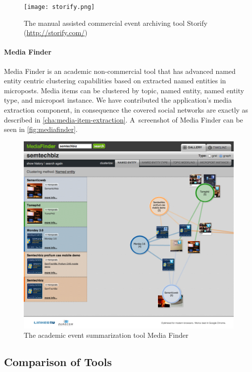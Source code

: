 \begin{figure}
  \centering
  \texttt{[image: storify.png]}
  \caption{The manual assisted commercial event archiving tool Storify
    (\url{http://storify.com/})}
  \label{fig:storify}
\end{figure}

\paragraph{Media Finder}

Media Finder is an academic non-commercial tool that
has advanced named entity centric clustering capabilities
based on extracted named entities in microposts.
Media items can be clustered by topic, named entity,
named entity type, and micropost instance.
We have contributed the application's media extraction component,
in consequence the covered social networks
are exactly as described in \autoref{cha:media-item-extraction}.
A~screenshot of Media Finder can be seen in \autoref{fig:mediafinder}.

\begin{figure}
  \centering
  \includegraphics[width=\linewidth]{mediafinder.png}
  \caption{The academic event summarization tool Media Finder}
  \label{fig:mediafinder}
\end{figure}

\subsection{Comparison of Tools}

